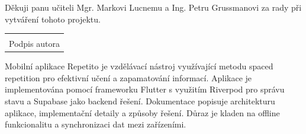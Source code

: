 \documentclass[12pt, a4paper, twoside, openright]{report}
\newcommand\datumOdevzdani{1. 1. 2025} %
\begin{document}
\cleardoublepage %
	
	\tableofcontents
	\cleardoublepage


	
	\noindent Děkuji panu učiteli Mgr. Markovi Lucnemu a Ing. Petru Grussmanovi za rady při vytváření tohoto projektu.
	
	\vspace*{0.7\textheight} %

	\vfill
	\noindent{V Opavě \datumOdevzdani\\}
	\noindent
	\begin{minipage}{\linewidth}
		\hspace{9.5cm} 
		\begin{tabular}{@{}p{6cm}@{}}
			\dotfill \\
			Podpis autora
		\end{tabular}
	\end{minipage}
	
	\cleardoublepage %

	Mobilní aplikace Repetito je vzdělávací nástroj využívající metodu spaced repetition pro efektivní učení a zapamatování informací. Aplikace je implementována pomocí frameworku Flutter s využitím Riverpod pro správu stavu a Supabase jako backend řešení. Dokumentace popisuje architekturu aplikace, implementační detaily a způsoby řešení. Důraz je kladen na offline funkcionalitu a synchronizaci dat mezi zařízeními.
\end{document}
